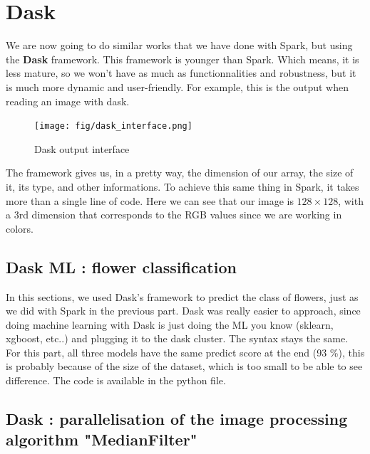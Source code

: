 \documentclass[10pt,twocolumn,letterpaper]{article}
\begin{document}
\section{Dask}

    We are now going to do similar works that we have done with Spark, but using
the \textbf{Dask} framework. This framework is younger than Spark. Which means,
it is less mature, so we won't have as much as functionnalities and robustness,
but it is much more dynamic and user-friendly. For example, this is the output
when reading an image with dask.

    \begin{figure}[H]
          \centering
          \caption{Dask output interface}
        \texttt{[image: fig/dask\_interface.png]}
    \end{figure}

The framework gives us, in a pretty way, the dimension of our array, the size of
it, its type, and other informations. To achieve this same thing in Spark, it
takes more than a single line of code. Here we can see that our image is
$128\times 128$, with a 3rd dimension that corresponds to the RGB values since
we are working in colors.

    \subsection{Dask ML : flower classification}

    In this sections, we used Dask's framework to predict the class of flowers,
just as we did with Spark in the previous part. Dask was really easier to
approach, since doing machine learning with Dask is just doing the ML you know
(sklearn, xgboost, etc..) and plugging it to the dask cluster. The syntax stays
the same. For this part, all three models have the same predict score at the end
(93 \%), this is probably because of the size of the dataset, which is too small
to be able to see difference. The code is available in the python file.

    \subsection{Dask : parallelisation of the image processing algorithm 
    "MedianFilter"}
    
\end{document}

